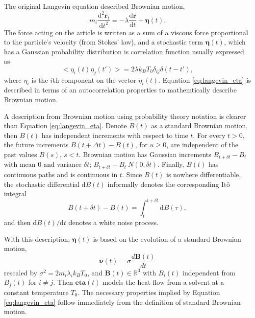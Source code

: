 The original Langevin equation\cite{langevin1908_equation} described Brownian motion,
\begin{equation}
  \label{eq:langevin}
  m_i \frac{\mathrm{d}^2 \bm{r}_i}
	         {\mathrm{d} t^2}
  =
  - \lambda
	  \frac{\mathrm{d} \bm{r}}
	       {\mathrm{d} t}
	+ \bm{\eta}(t).
\end{equation}
The force acting on the article is written as a sum of a viscous force proportional to the particle's velocity (from Stokes' law), and a stochastic term $\bm{\eta}(t)$, which has a Gaussian probability distribution is correlation function usually expressed as
\begin{equation}
  \label{eq:langevin_eta}
  <\eta_i(t) \eta_j(t')> = 2 \lambda k_B T_0 \delta_{ij} \delta(t-t'),
\end{equation}
where $\eta_i$ is the $i$th component on the vector $\eta_i(t)$.  Equation \ref{eq:langevin_eta} is described in terms of an autocorrelation properties to mathemtically describe Brownian motion.

A description from Brownian motion using probability theory notation\cite{karatzas1991_sde} is clearer than Equation \ref{eq:langevin_eta}. Denote $B(t)$ as a standard Brownian motion, then $B(t)$ has independent increments with respect to time $t$.  For every $t > 0$, the future increments $B(t+\Delta t) - B(t)$, for $u \geq 0$, are independent of the past values $B(s)$, $s < t$.  Brownian motion has Gaussian increments $B_{t+\delta t}-B_{t}$ with mean $0$ and variance $\delta t$; $B_{t+\delta t}-B_{t}~N(0,\delta t)$.
Finally, $B(t)$ has continuous paths and is continuous in $t$.
Since $B(t)$ is nowhere differentiable, the stochastic differential $\mathrm{d}B(t)$ informally denotes the corresponding It\^{o} integral
\begin{equation}
  B(t+\delta t) - B(t)
	=
	\int_t^{t+\delta{t}} \!\!\! \mathrm{d}B(\tau),
\end{equation}
and then $\mathrm{d} B(t)/\mathrm{d}t$ denotes a white noise process.

With this description, $\bm{\eta}(t)$ is based on the evolution of a standard Brownian motion,
\begin{equation}
  \bm{\nu}(t) = \sigma \frac{d\bm{B}(t)}{dt}
\end{equation}
rescaled by $\sigma^2 = 2 m_i \lambda_i k_B T_0$, and $\bm{B}(t) \in \mathbb{R}^3$ with $B_i(t)$ independent from $B_j(t)$ for $i \neq j$.  Then $\bm{eta}(t)$ models the heat flow from a solvent at a constant temperature $T_0$.  The necessary properties implied by Equation \ref{eq:langevin_eta} follow immediately from the definition of standard Brownian motion.

